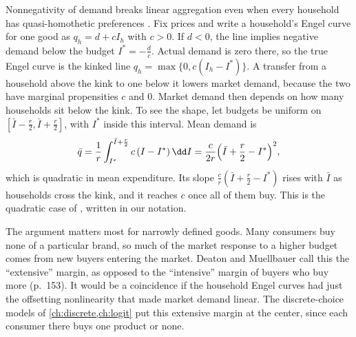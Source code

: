 Nonnegativity of demand breaks linear aggregation even when every household has quasi-homothetic
preferences \citep[\S 6.1, pp.~150--153]{DeatonMuellbauer1980b}. Fix prices and write a household's
Engel curve for one good as $q_h = d + cI_h$ with $c > 0$. If $d < 0$, the line implies negative demand
below the budget $I^* = -\frac{d}{c}$. Actual demand is zero there, so the true Engel curve is the
kinked line $q_h = \max\{0, c(I_h - I^*)\}$. A transfer from a household above the kink to one below it
lowers market demand, because the two have marginal propensities $c$ and $0$. Market demand then depends
on how many households sit below the kink. To see the shape, let budgets be uniform on $[\bar I -
\frac{r}{2}, \bar I + \frac{r}{2}]$, with $I^*$ inside this interval. Mean demand is
\begin{equation*}
  \bar q = \frac{1}{r}\int_{I^*}^{\bar I + \frac{r}{2}} c\,(I - I^*)\,\dd I
         = \frac{c}{2r}\Bigl(\bar I + \frac{r}{2} - I^*\Bigr)^2 ,
\end{equation*}
which is quadratic in mean expenditure. Its slope $\frac{c}{r}(\bar I + \frac{r}{2} - I^*)$ rises with
$\bar I$ as households cross the kink, and it reaches $c$ once all of them buy. This is the quadratic
case of \citet[Exercise~6.5]{DeatonMuellbauer1980b}, written in our notation.

The argument matters most for narrowly defined goods. Many consumers buy none of a particular brand, so
much of the market response to a higher budget comes from new buyers entering the market. Deaton and
Muellbauer call this the ``extensive'' margin, as opposed to the ``intensive'' margin of buyers who buy
more (p.~153). It would be a coincidence if the household Engel curves had just the offsetting
nonlinearity that made market demand linear. The discrete-choice models of \cref{ch:discrete,ch:logit}
put this extensive margin at the center, since each consumer there buys one product or none.

